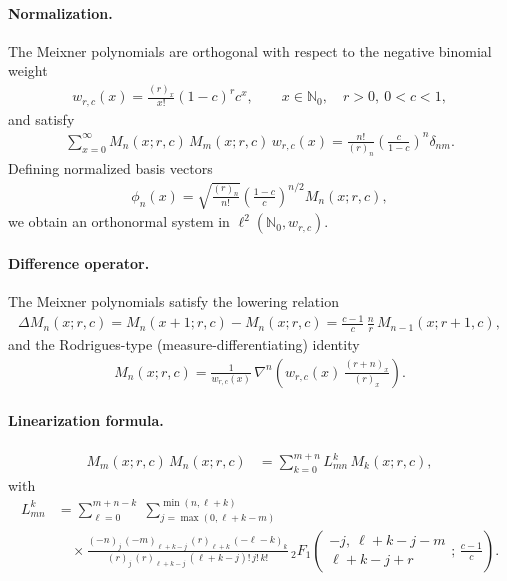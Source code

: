 \documentclass[a4paper,11pt]{article}
\numberwithin{equation}{section}
\theoremstyle{plain}
\theoremstyle{definition}
\theoremstyle{remark}
\newcommand{\1}{\ensuremath{\mathds{1}}\xspace}
\begin{document}
\paragraph{Normalization.}
The Meixner polynomials are orthogonal with respect to the negative binomial weight
\begin{align}
w_{r,c}(x)
=
\frac{(r)_x}{x!}(1-c)^r c^x,
\qquad x\in\mathbb{N}_0,\quad r>0,\ 0<c<1,
\end{align}
and satisfy
\begin{align}
\sum_{x=0}^\infty
M_n(x;r,c)\,M_m(x;r,c)\,w_{r,c}(x)
=
\frac{n!}{(r)_n}
\left(\frac{c}{1-c}\right)^n
\delta_{nm}.
\end{align}
Defining normalized basis vectors
\begin{align}
\phi_n(x)
=
\sqrt{\frac{(r)_n}{n!}}
\left(\frac{1-c}{c}\right)^{n/2}
M_n(x;r,c),
\end{align}
we obtain an orthonormal system in $\ell^2(\mathbb{N}_0,w_{r,c})$.
\paragraph{Difference operator.}
The Meixner polynomials satisfy the lowering relation
\begin{align}
\Delta M_n(x;r,c)
=
M_n(x+1;r,c)-M_n(x;r,c)
=
\frac{c-1}{c}\,\frac{n}{r}\,M_{n-1}(x;r+1,c),
\end{align}
and the Rodrigues-type (measure-differentiating) identity
\begin{align}
M_n(x;r,c)
=
\frac{1}{w_{r,c}(x)}\,\nabla^n\!\left(w_{r,c}(x)\,\frac{(r+n)_x}{(r)_x}\right).
\end{align}
\paragraph{Linearization formula.}
\begin{align}
M_m(x;r,c)\,M_n(x;r,c)
&=\sum_{k=0}^{m+n} L^{k}_{mn}\,M_k(x;r,c),
\end{align}
with
\begin{align}
L^{k}_{mn}
&=
\sum_{\ell=0}^{m+n-k}\;
\sum_{j=\max(0,\ell+k-m)}^{\min(n,\ell+k)}
\\
&\quad\times
\frac{(-n)_j\,(-m)_{\ell+k-j}\,(r)_{\ell+k}\,(-\ell-k)_k}
{(r)_j\,(r)_{\ell+k-j}\,(\ell+k-j)!\,j!\,k!}\,
{}_2F_{1}\!\left(
\begin{matrix}
-j,\ \ell+k-j-m\\
\ell+k-j+r
\end{matrix};\,\frac{c-1}{c}\right).
\end{align}
\end{document}
